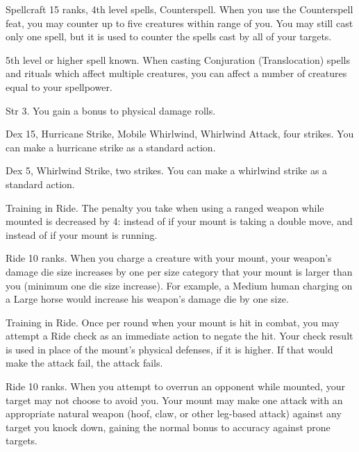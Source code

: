 \featpres Spellcraft 15 ranks, 4th level spells, Counterspell.
\featben When you use the Counterspell feat, you may counter up to five creatures within \rngmed range of you.
You may still cast only one spell, but it is used to counter the spells cast by all of your targets.

\featpre 5th level or higher  spell known.
\featben When casting Conjuration (Translocation) spells and rituals which affect multiple creatures, you can affect a number of creatures equal to your spellpower.

\featpres Str 3.
\featben You gain a  bonus to physical damage rolls.

\featpres Dex 15, Hurricane Strike, Mobile Whirlwind, Whirlwind Attack, four strikes.
\featben You can make a hurricane strike as a standard action.

\featpres Dex 5, Whirlwind Strike, two strikes.
\featben You can make a whirlwind strike as a standard action.

\featpre Training in Ride.
\featben The penalty you take when using a ranged weapon while mounted is decreased by 4:  instead of  if your mount is taking a double move, and  instead of  if your mount is running.

\featpre Ride 10 ranks.
\featben When you charge a creature with your mount, your weapon's damage die size increases by one per size category that your mount is larger than you (minimum one die size increase).
For example, a Medium human charging on a Large horse would increase his weapon's damage die by one size.

\featpre Training in Ride.
\featben Once per round when your mount is hit in combat, you may attempt a Ride check as an immediate action to negate the hit.
Your check result is used in place of the mount's physical defenses, if it is higher.
If that would make the attack fail, the attack fails.

\featpre Ride 10 ranks.
\featben When you attempt to overrun an opponent while mounted, your target may not choose to avoid you.
Your mount may make one attack with an appropriate natural weapon (hoof, claw, or other leg-based attack) against any target you knock down, gaining the normal  bonus to accuracy against prone targets.


